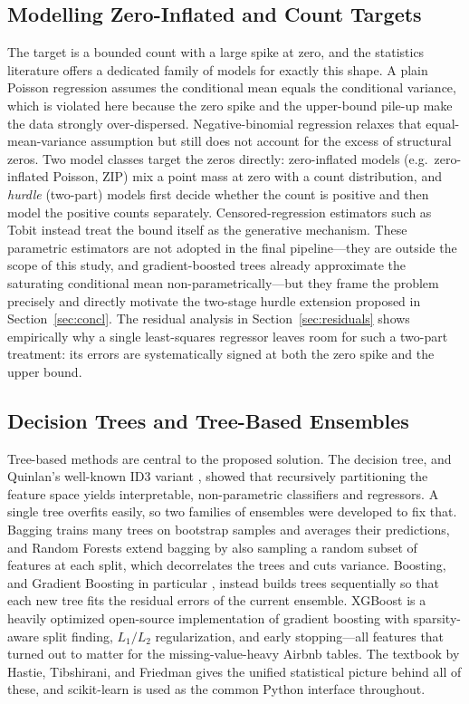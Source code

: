 \documentclass[journal]{IEEEtran}
\begin{document}
\subsection{Modelling Zero-Inflated and Count Targets}
\label{sec:zeroinflated}
The target is a bounded count with a large spike at zero, and the statistics
literature offers a dedicated family of models for exactly this shape. A plain
Poisson regression assumes the conditional mean equals the conditional variance,
which is violated here because the zero spike and the upper-bound pile-up make
the data strongly over-dispersed. Negative-binomial regression relaxes that
equal-mean-variance assumption but still does not account for the excess of
structural zeros. Two model classes target the zeros directly: zero-inflated
models (e.g.\ zero-inflated Poisson, ZIP) mix a point mass at zero with a count
distribution, and \emph{hurdle} (two-part) models first decide whether the count
is positive and then model the positive counts separately. Censored-regression
estimators such as Tobit \cite{tobin1958} instead treat the bound itself as the
generative mechanism. These parametric estimators are not adopted in the final
pipeline---they are outside the scope of this study, and gradient-boosted trees
already approximate the saturating conditional mean non-parametrically---but they
frame the problem precisely and directly motivate the two-stage hurdle extension
proposed in Section~\ref{sec:concl}. The residual analysis in
Section~\ref{sec:residuals} shows empirically why a single least-squares
regressor leaves room for such a two-part treatment: its errors are systematically
signed at both the zero spike and the upper bound.

\subsection{Decision Trees and Tree-Based Ensembles}
Tree-based methods are central to the proposed solution. The decision tree, and Quinlan's well-known ID3 variant
\cite{quinlan1986}, showed that recursively partitioning the feature space
yields interpretable, non-parametric classifiers and regressors. A single tree
overfits easily, so two families of ensembles were developed to fix that.
Bagging \cite{breiman1996} trains many trees on bootstrap samples and averages
their predictions, and Random Forests \cite{breiman2001} extend bagging by also
sampling a random subset of features at each split, which decorrelates the trees
and cuts variance. Boosting, and Gradient Boosting in particular
\cite{friedman2001}, instead builds trees sequentially so that each new tree
fits the residual errors of the current ensemble. XGBoost \cite{chen2016xgboost}
is a heavily optimized open-source implementation of gradient boosting with
sparsity-aware split finding, $L_1/L_2$ regularization, and early stopping---all
features that turned out to matter for the missing-value-heavy Airbnb tables.
The textbook by Hastie, Tibshirani, and Friedman \cite{hastie2009esl} gives the
unified statistical picture behind all of these, and scikit-learn
\cite{pedregosa2011sklearn} is used as the common Python interface throughout.
\end{document}
